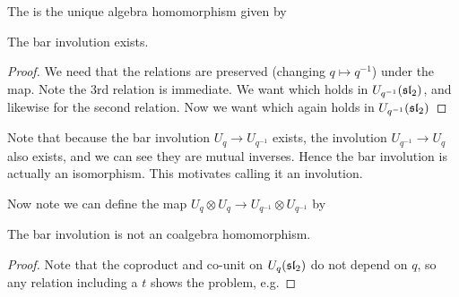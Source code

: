\documentclass{article}
\begin{document}
\begin{definition}
The  is the unique algebra homomorphism given by
\end{definition}

\begin{prop}\label{prop:CQIS:barinvolutionhomomorphism}
The bar involution exists.
\end{prop}
\begin{proof}
We need that the relations 
are preserved (changing $q \mapsto q^{-1}$) under the map. Note the 3rd relation is immediate. We want
which holds in $U_{q^{-1}}(\mathfrak{sl}_2)$, and likewise for the second relation. Now we want 
which again holds in $U_{q^{-1}}(\mathfrak{sl}_2)$
\end{proof}

\begin{remark}
Note that because the bar involution $U_q \to U_{q^{-1}}$ exists, the involution $U_{q^{-1}} \to U_q$ also exists, and we can see they are mutual inverses. Hence the bar involution is actually an isomorphism. This motivates calling it an involution.  
\end{remark}

Now note we can define the map $U_q \otimes U_q \to U_{q^{-1}} \otimes U_{q^{-1}}$ by 

\begin{prop}
The bar involution is not an coalgebra homomorphism. 
\end{prop}
\begin{proof}
Note that the coproduct and co-unit on $U_q(\mathfrak{sl}_2)$ do not depend on $q$, so any relation including a $t$ shows the problem, e.g. 
\end{proof}
\end{document}
